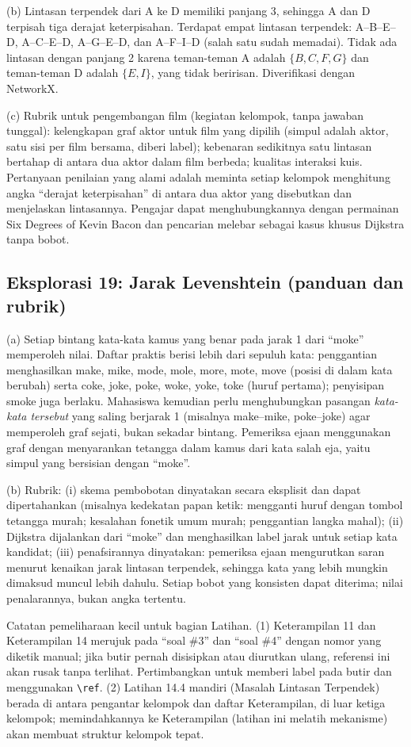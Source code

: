 (b) Lintasan terpendek dari A ke D memiliki panjang 3, sehingga A dan D terpisah tiga derajat keterpisahan. Terdapat empat lintasan terpendek: A--B--E--D, A--C--E--D, A--G--E--D, dan A--F--I--D (salah satu sudah memadai). Tidak ada lintasan dengan panjang 2 karena teman-teman A adalah $\{B, C, F, G\}$ dan teman-teman D adalah $\{E, I\}$, yang tidak beririsan. Diverifikasi dengan NetworkX.

(c) Rubrik untuk pengembangan film (kegiatan kelompok, tanpa jawaban tunggal): kelengkapan graf aktor untuk film yang dipilih (simpul adalah aktor, satu sisi per film bersama, diberi label); kebenaran sedikitnya satu lintasan bertahap di antara dua aktor dalam film berbeda; kualitas interaksi kuis. Pertanyaan penilaian yang alami adalah meminta setiap kelompok menghitung angka “derajat keterpisahan” di antara dua aktor yang disebutkan dan menjelaskan lintasannya. Pengajar dapat menghubungkannya dengan permainan Six Degrees of Kevin Bacon dan pencarian melebar sebagai kasus khusus Dijkstra tanpa bobot.

\subsection*{Eksplorasi 19: Jarak Levenshtein (panduan dan rubrik)}

(a) Setiap bintang kata-kata kamus yang benar pada jarak 1 dari “moke” memperoleh nilai. Daftar praktis berisi lebih dari sepuluh kata: penggantian menghasilkan make, mike, mode, mole, more, mote, move (posisi di dalam kata berubah) serta coke, joke, poke, woke, yoke, toke (huruf pertama); penyisipan smoke juga berlaku. Mahasiswa kemudian perlu menghubungkan pasangan \emph{kata-kata tersebut} yang saling berjarak 1 (misalnya make--mike, poke--joke) agar memperoleh graf sejati, bukan sekadar bintang. Pemeriksa ejaan menggunakan graf dengan menyarankan tetangga dalam kamus dari kata salah eja, yaitu simpul yang bersisian dengan “moke”.

(b) Rubrik: (i) skema pembobotan dinyatakan secara eksplisit dan dapat dipertahankan (misalnya kedekatan papan ketik: mengganti huruf dengan tombol tetangga murah; kesalahan fonetik umum murah; penggantian langka mahal); (ii) Dijkstra dijalankan dari “moke” dan menghasilkan label jarak untuk setiap kata kandidat; (iii) penafsirannya dinyatakan: pemeriksa ejaan mengurutkan saran menurut kenaikan jarak lintasan terpendek, sehingga kata yang lebih mungkin dimaksud muncul lebih dahulu. Setiap bobot yang konsisten dapat diterima; nilai penalarannya, bukan angka tertentu.

\begin{qaflag}
Catatan pemeliharaan kecil untuk bagian Latihan. (1) Keterampilan 11 dan Keterampilan 14 merujuk pada ``soal \#3'' dan ``soal \#4'' dengan nomor yang diketik manual; jika butir pernah disisipkan atau diurutkan ulang, referensi ini akan rusak tanpa terlihat. Pertimbangkan untuk memberi label pada butir dan menggunakan \texttt{\textbackslash ref}. (2) Latihan 14.4 mandiri (Masalah Lintasan Terpendek) berada di antara pengantar kelompok dan daftar Keterampilan, di luar ketiga kelompok; memindahkannya ke Keterampilan (latihan ini melatih mekanisme) akan membuat struktur kelompok tepat.
\end{qaflag}
